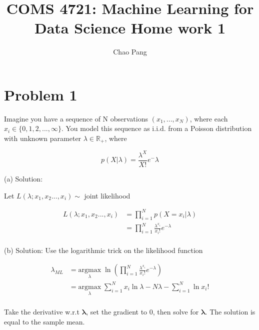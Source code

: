 \documentclass[11pt]{report}
\begin{document}
\title{COMS 4721: Machine Learning for Data Science 
Home work 1}
\author{Chao Pang}
 
\maketitle

\section{Problem 1}
Imagine you have a sequence of N observations $(x_1,...,x_N)$, where each $x_i \in \{0,1,2,...,\infty\}$. You
model this sequence as i.i.d. from a Poisson distribution with unknown parameter $\lambda \in \mathbb{R}_+$, where

\[ p(X|\lambda) = \frac{ \lambda^X}{X!}e^-\lambda \]

\justify
(a) Solution: 

\begin{center}
Let $L(\lambda; x_1, x_2 ..., x_i)  \sim$ joint likelihood
\end{center}

\begin{equation*}
\begin{split}
L(\lambda; x_1, x_2 ..., x_i)  & = \prod_{i=1}^N p(X=x_i| \lambda) \\
&  = \prod_{i=1}^N\frac{\lambda^{x_i}}{x_i!} e^{-\lambda} \\
\end{split}
\end{equation*}


\justify
(b) Solution: 
Use the logarithmic trick on the likelihood function

\begin{equation*}
\begin{split}
\lambda_{ML} & = \underset{\lambda}{\mathrm{argmax}} \; \ln{(\prod_{i=1}^N\frac{\lambda^{x_i}}{x_i!} e^{-\lambda})} \\
& = \underset{\lambda}{\mathrm{argmax}} \; {\sum_{i=1}^N{x_i}\ln{\lambda} }  - {N\lambda}  -  {\sum_{i=1}^N\ln{x_i!}}\\
\end{split}
\end{equation*}

\begin{flushleft}
Take the derivative w.r.t $\boldsymbol{\lambda}$, set the gradient to 0, then solve for $\boldsymbol{\lambda}$. The solution is equal to the sample mean. 
\end{flushleft}
\end{document}
